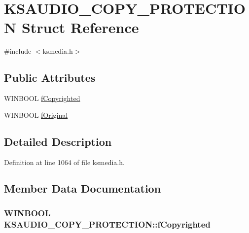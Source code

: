 \hypertarget{struct_k_s_a_u_d_i_o___c_o_p_y___p_r_o_t_e_c_t_i_o_n}{}\section{K\+S\+A\+U\+D\+I\+O\+\_\+\+C\+O\+P\+Y\+\_\+\+P\+R\+O\+T\+E\+C\+T\+I\+ON Struct Reference}
\label{struct_k_s_a_u_d_i_o___c_o_p_y___p_r_o_t_e_c_t_i_o_n}


{\ttfamily \#include $<$ksmedia.\+h$>$}

\subsection*{Public Attributes}
\begin{DoxyCompactItemize}
\item 
W\+I\+N\+B\+O\+OL \hyperlink{struct_k_s_a_u_d_i_o___c_o_p_y___p_r_o_t_e_c_t_i_o_n_ac8423773da2ace95cc6582ff1098d6b7}{f\+Copyrighted}
\item 
W\+I\+N\+B\+O\+OL \hyperlink{struct_k_s_a_u_d_i_o___c_o_p_y___p_r_o_t_e_c_t_i_o_n_acec638d3923829b15255387a3b8a91b0}{f\+Original}
\end{DoxyCompactItemize}


\subsection{Detailed Description}


Definition at line 1064 of file ksmedia.\+h.



\subsection{Member Data Documentation}
\subsubsection[{\texorpdfstring{f\+Copyrighted}{fCopyrighted}}]{\setlength{\rightskip}{0pt plus 5cm}W\+I\+N\+B\+O\+OL K\+S\+A\+U\+D\+I\+O\+\_\+\+C\+O\+P\+Y\+\_\+\+P\+R\+O\+T\+E\+C\+T\+I\+O\+N\+::f\+Copyrighted}\hypertarget{struct_k_s_a_u_d_i_o___c_o_p_y___p_r_o_t_e_c_t_i_o_n_ac8423773da2ace95cc6582ff1098d6b7}{}\label{struct_k_s_a_u_d_i_o___c_o_p_y___p_r_o_t_e_c_t_i_o_n_ac8423773da2ace95cc6582ff1098d6b7}


